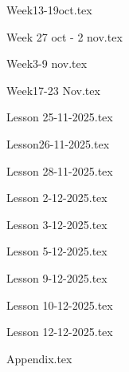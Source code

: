 \documentclass[a4paper, 12pt]{book} %
\begin{document}
    
    \thispagestyle{empty} %

    \tableofcontents %
    \clearpage

    
    {Week13-19oct.tex}

    {Week 27 oct - 2 nov.tex}

    {Week3-9 nov.tex}

    {Week17-23 Nov.tex}

    {Lesson 25-11-2025.tex}

    {Lesson26-11-2025.tex}

    {Lesson 28-11-2025.tex}

    {Lesson 2-12-2025.tex}

    {Lesson 3-12-2025.tex}

    {Lesson 5-12-2025.tex}

    {Lesson 9-12-2025.tex}

    {Lesson 10-12-2025.tex}

    {Lesson 12-12-2025.tex}

    {Appendix.tex}
    
\end{document}
